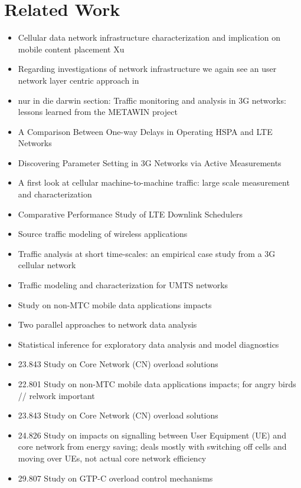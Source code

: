 \section{Related Work}
\label{c4:relwork}

\begin{itemize}
	\item Cellular data network infrastructure characterization and implication on mobile content placement Xu\cite{Xu:2011:CDN:2007116.2007149}
	\item Regarding investigations of network infrastructure we again see an user network layer centric approach in \cite{Xu:2011:CDN:2007116.2007149}
	\item nur in die darwin section: Traffic monitoring and analysis in 3G networks: lessons learned from the METAWIN project \cite{ricciato2006traffic}
	\item A Comparison Between One-way Delays in Operating HSPA and LTE Networks \cite{laner2012delaycomparison}
	\item Discovering Parameter Setting in 3G Networks via Active Measurements \cite{4640935}
	\item A first look at cellular machine-to-machine traffic: large scale measurement and characterization \cite{Shafiq:2012:FLC:2254756.2254767}
	\item Comparative Performance Study of LTE Downlink Schedulers \cite{biernacki2013ltescheduler}
	\item Source traffic modeling of wireless applications \cite{staehle2000source}
	\item Traffic analysis at short time-scales: an empirical case study from a 3G cellular network \cite{4570772}
	\item Traffic modeling and characterization for UMTS networks \cite{965876}
	\item Study on non-MTC mobile data applications impacts \cite{3gpp.22.801}
	\item Two parallel approaches to network data analysis \cite{baer2011two}
	\item Statistical inference for exploratory data analysis and model diagnostics \cite{Buja13112009}
	\item 23.843 \cite{3gpp.23.843} Study on Core Network (CN) overload solutions
\end{itemize}

\begin{itemize}
	\item 22.801 \cite{3gpp.22.801} Study on non-MTC mobile data applications impacts; for angry birds // relwork important
	\item 23.843 \cite{3gpp.23.843} Study on Core Network (CN) overload solutions
	\item 24.826 \cite{3gpp.24.826} Study on impacts on signalling between User Equipment (UE) and core network from energy saving; deals mostly with switching off cells and moving over UEs, not actual core network efficiency
	\item 29.807 \cite{3gpp.29.807} Study on GTP-C overload control mechanisms
\end{itemize}


